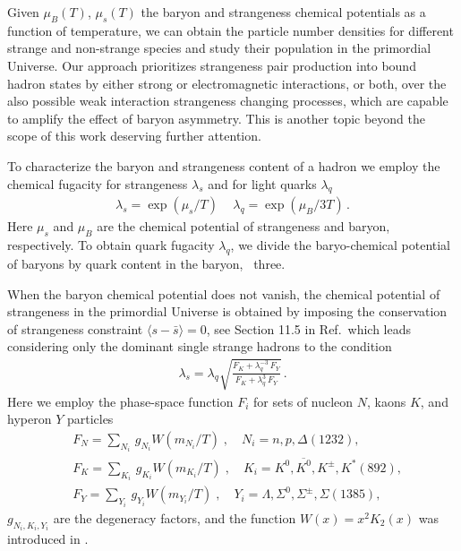 Given $\mu_B(T)$, $\mu_s(T)$ the baryon and strangeness chemical potentials as a function of temperature, we can obtain the particle number densities for different strange and non-strange species and study their population in the primordial Universe. Our approach prioritizes strangeness pair production into bound hadron states by either strong or electromagnetic interactions, or both, over the also possible weak interaction strangeness changing processes, which are capable to amplify the effect of baryon asymmetry. This is another topic beyond the scope of this work deserving further attention.

To characterize the baryon and strangeness content of a hadron we employ the chemical fugacity for strangeness $\lambda_s$ and for light quarks $\lambda_q$ 
\begin{align}
\lambda_s=\exp(\mu_s/T)\,\quad \lambda_q=\exp(\mu_B/3T)\,.
\end{align}
Here $\mu_s$ and $\mu_B$ are the chemical potential of strangeness and baryon, respectively. To obtain quark fugacity $\lambda_q$, we divide the baryo-chemical potential of baryons by quark content in the baryon, \ie\ three.

When the baryon chemical potential does not vanish, the chemical potential of strangeness in the primordial Universe is obtained by imposing the conservation of strangeness constraint $\langle s-\bar s \rangle=0$, see Section 11.5 in Ref.\,\cite{Letessier:2002ony} which leads considering only the dominant single strange hadrons to the condition
\begin{align}\label{museq}
\lambda_s=\lambda_q\sqrt{\frac{F_K+\lambda^{-3}_q\,F_Y}{F_K+\lambda^3_q\,F_Y}}\,.
\end{align}
Here we employ the phase-space function $F_i$ for sets of nucleon $N$, kaons $K$, and hyperon $Y$ particles 
\begin{align}
&F_N=\sum_{N_i}\,g_{N_i}W(m_{N_i}/T)\;, \quad N_i=n, p, \Delta(1232),\\
&F_K=\sum_{K_i}\,g_{K_i}W(m_{K_i}/T)\;, \quad K_i=K^0, \overline{K^0}, K^\pm, K^\ast(892),\\
&F_Y=\sum_{Y_i}\,g_{Y_i}W(m_{Y_i}/T)\;, \quad Y_i=\Lambda, \Sigma^0,\Sigma^\pm, \Sigma(1385),
\end{align}
$g_{N_i,K_i,Y_i}$ are the degeneracy factors, and the function $W(x)=x^2K_2(x)$ was introduced in .

